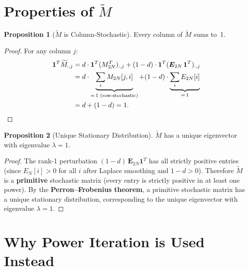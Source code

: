 \documentclass[11pt,a4paper]{article}
\theoremstyle{definition}
\newtheorem{proposition}{Proposition}
\begin{document}
\section{\texorpdfstring{Properties of $\widetilde{M}$}{Properties of M-tilde}}

\begin{proposition}[{$\widetilde{M}$ is Column-Stochastic}]\label{prop:stochastic}
Every column of $\widetilde{M}$ sums to~1.
\end{proposition}

\begin{proof}
For any column $j$:
\begin{align}
\bm{1}^T \widetilde{M}_{:,j}
&= d \cdot \bm{1}^T (M_{2N}^T)_{:,j}
 + (1-d) \cdot \bm{1}^T (\bm{E}_{2N}\,\bm{1}^T)_{:,j} \notag \\
&= d \cdot \underbrace{\sum_i M_{2N}[j,i]}_{=\,1\text{ (row-stochastic)}}
 + (1-d) \cdot \underbrace{\sum_i E_{2N}[i]}_{=\,1} \notag \\
&= d + (1-d) = 1. \qedhere
\end{align}
\end{proof}

\begin{proposition}[{Unique Stationary Distribution}]\label{prop:unique}
$\widetilde{M}$ has a unique eigenvector with eigenvalue $\lambda = 1$.
\end{proposition}

\begin{proof}
The rank-1 perturbation $(1-d)\,\bm{E}_{2N}\bm{1}^T$ has all strictly
positive entries (since $E_N[i] > 0$ for all $i$ after Laplace smoothing
and $1-d > 0$).  Therefore $\widetilde{M}$ is a \textbf{primitive}
stochastic matrix (every entry is strictly positive in at least one power).
By the \textbf{Perron--Frobenius theorem}, a primitive stochastic matrix
has a unique stationary distribution, corresponding to the unique
eigenvector with eigenvalue $\lambda = 1$.
\end{proof}

\section{Why Power Iteration is Used Instead}
\end{document}
